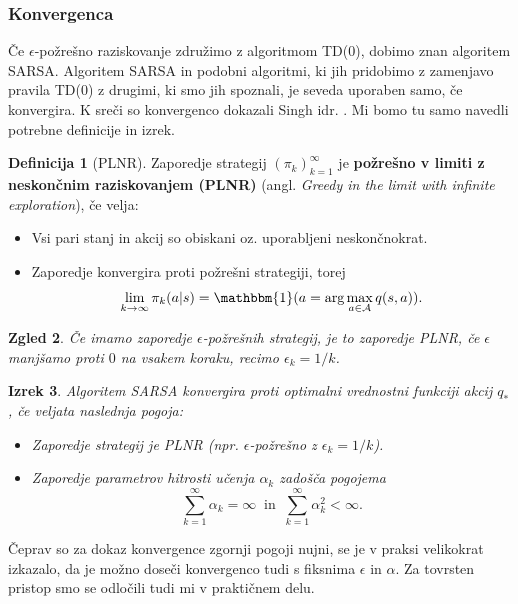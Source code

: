\documentclass[12pt,a4paper]{amsart}
\theoremstyle{definition} %
\newtheorem{definicija}{Definicija}[section]
\theoremstyle{plain} %
\newtheorem{izrek}[definicija]{Izrek}
\newtheorem{zgled}[definicija]{Zgled}
\begin{document}
\subsubsection{Konvergenca}
Če $\epsilon$-požrešno raziskovanje združimo z algoritmom TD($0$), dobimo znan algoritem SARSA. 
Algoritem SARSA in podobni algoritmi, ki jih pridobimo z zamenjavo pravila TD($0$) z drugimi, ki smo 
jih spoznali, je seveda uporaben samo, če konvergira. K sreči so konvergenco dokazali Singh idr. 
\cite{dokaz}. Mi bomo tu samo navedli potrebne definicije in izrek.

\begin{definicija}[PLNR]
    Zaporedje strategij $(\pi_k)_{k=1}^\infty$ je \textbf{požrešno v limiti z neskončnim raziskovanjem 
    (PLNR)} (angl. \textit{Greedy in the limit with infinite exploration}), če velja:
    \begin{itemize}
        \item Vsi pari stanj in akcij so obiskani oz. uporabljeni neskončnokrat.
        \item Zaporedje konvergira proti požrešni strategiji, torej 
            $$
            \lim_{k \rightarrow \infty} \pi_k(a|s) = \mathbbm{1} (a = \text{arg}\max_{a \in \mathcal{A}} 
                q(s, a)).
            $$
    \end{itemize}
\end{definicija}

\begin{zgled}
    Če imamo zaporedje $\epsilon$-požrešnih strategij, je to zaporedje PLNR, če $\epsilon$ manjšamo 
    proti $0$ na vsakem koraku, recimo $\epsilon_k = 1 / k$.
\end{zgled}

\begin{izrek}
    Algoritem SARSA konvergira proti optimalni vrednostni funkciji akcij $q_*$, če veljata naslednja 
    pogoja:
    \begin{itemize}
        \item Zaporedje strategij je PLNR (npr. $\epsilon$-požrešno z $\epsilon_k = 1 / k$).
        \item Zaporedje parametrov hitrosti učenja $\alpha_k$ zadošča pogojema
            $$
            \sum_{k=1}^\infty \alpha_k = \infty~\text{ in }~\sum_{k=1}^\infty \alpha_k^2 < \infty.
            $$
    \end{itemize}
\end{izrek}

Čeprav so za dokaz konvergence zgornji pogoji nujni, se je v praksi velikokrat izkazalo, da je možno 
doseči konvergenco tudi s fiksnima $\epsilon$ in $\alpha$. Za tovrsten pristop smo se odločili tudi 
mi v praktičnem delu.
\end{document}
